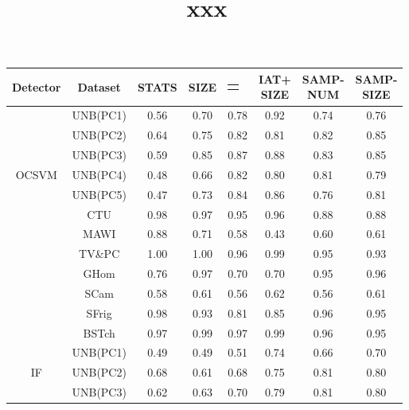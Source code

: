 \documentclass{article}
\title{xxx}
\makeatletter
\newcommand{\SIZE}{$SIZE$}
\newcommand{\Cell}[1]{\begin{tabular}{@{}c}{\Centerstack[c]{#1}}\end{tabular}}
\makeatother
\begin{document}
\maketitle

\begin{longtable}[c]{|c|c|c|c|c|c|c|c|}
\toprule
  Detector & Dataset & STATS & SIZE & \Cell{IAT} & \Cell{IAT+\\SIZE} & \Cell{SAMP-\\NUM} & \Cell{SAMP-\\SIZE}  \\ 
\midrule
\multirow{7}{*}{OCSVM} &UNB(PC1) & 0.56 & 0.70 & 0.78 & 0.92 & 0.74 & 0.76  \\ 
&UNB(PC2) & 0.64 & 0.75 & 0.82 & 0.81 & 0.82 & 0.85  \\ 
&UNB(PC3) & 0.59 & 0.85 & 0.87 & 0.88 & 0.83 & 0.85 \\ 
&UNB(PC4) & 0.48 & 0.66 & 0.82 & 0.80 & 0.81 & 0.79 \\ 
&UNB(PC5) & 0.47 & 0.73 & 0.84 & 0.86 & 0.76 & 0.81 \\ 
\cmidrule{2-8}
&CTU & 0.98 & 0.97 & 0.95 & 0.96 & 0.88 & 0.88\\ 
\cmidrule{2-8}
&MAWI & 0.88 & 0.71 & 0.58 & 0.43 & 0.60 & 0.61\\ 
\cmidrule{2-8}
&TV\&PC & 1.00 & 1.00 & 0.96 & 0.99 & 0.95 & 0.93\\ 
\cmidrule{2-8}
&GHom & 0.76 & 0.97 & 0.70 & 0.70 & 0.95 & 0.96\\ 
&SCam & 0.58 & 0.61 & 0.56 & 0.62 & 0.56 & 0.61\\ 
&SFrig & 0.98 & 0.93 & 0.81 & 0.85 & 0.96 & 0.95 \\ 
&BSTch & 0.97 & 0.99 & 0.97 & 0.99 & 0.96 & 0.95  \\ 
\midrule
\multirow{7}{*}{IF} &UNB(PC1) & 0.49 & 0.49 & 0.51 & 0.74 & 0.66 & 0.70  \\ 
&UNB(PC2) & 0.68 & 0.61 & 0.68 & 0.75 & 0.81 & 0.80  \\ 
&UNB(PC3) & 0.62 & 0.63 & 0.70 & 0.79 & 0.81 & 0.80 \\ 

\end{longtable}
\end{document}
